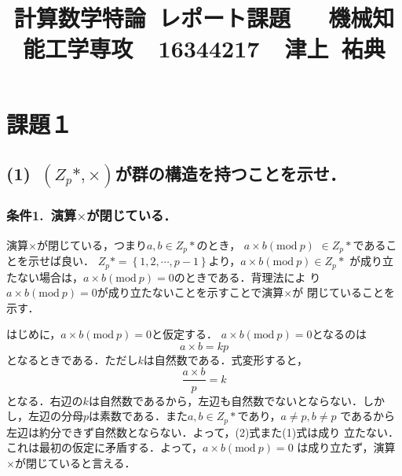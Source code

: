 \documentclass[a4paper,12pt]{jarticle}
\begin{document}
%
\title{\vspace{-30mm}  \large{計算数学特論~レポート課題~~~機械知能工学専攻~~16344217~~津上~祐典}}
\date{}
%
\maketitle
%
\vspace{-35mm}
%
\section*{課題１}
\vspace{-3mm}
\subsection*{(1)~$(Z_p*,\times)$が群の構造を持つことを示せ．}
\subsubsection*{条件1.~演算$\times$が閉じている．}
\vspace{-5mm}
演算$\times$が閉じている，つまり$a,b\in Z_p*$のとき，
$a\times b(\mathrm{mod}~p)$ $\in Z_p*$であることを示せば良い．
$Z_p*= \left\{1,2,\cdots,p-1 \right\}$より，$a\times b(\mathrm{mod}~p)\in Z_p*$
が成り立たない場合は，$a\times b(\mathrm{mod}~p)=0$のときである．背理法によ
り$a\times b(\mathrm{mod}~p)=0$が成り立たないことを示すことで演算$\times$が
閉じていることを示す．

はじめに，$a\times b(\mathrm{mod}~p)=0$と仮定する．
$a\times b(\mathrm{mod}~p)=0$となるのは
%
\begin{equation}
 a \times b =kp
\end{equation}
%
となるときである．ただし$k$は自然数である．式変形すると，
%
\begin{equation}
 \frac{a \times b}{p} = k
\end{equation}
%
となる．右辺の$k$は自然数であるから，左辺も自然数でないとならない．しか
し，左辺の分母$p$は素数である．また$a,b\in Z_p*$であり，$a\neq p,b\neq p$
であるから左辺は約分できず自然数とならない．よって，(2)式また(1)式は成り
立たない．これは最初の仮定に矛盾する．よって，$a\times b(\mathrm{mod}~p)=0$
は成り立たず，演算$\times$が閉じていると言える．
%
\vspace{-5mm}
\end{document}
